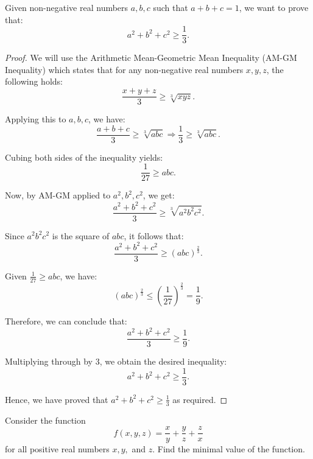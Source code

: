 \begin{exercise}
    Given non-negative real numbers \( a, b, c \) such that \( a + b + c = 1 \), we want to prove that:
\[ a^2 + b^2 + c^2 \geq \frac{1}{3}. \]
\end{exercise}
\begin{proof}
    We will use the Arithmetic Mean-Geometric Mean Inequality (AM-GM Inequality) which states that for any non-negative real numbers \( x, y, z \), the following holds:
\[ \frac{x + y + z}{3} \geq \sqrt[3]{xyz}. \]

Applying this to \( a, b, c \), we have:
\[ \frac{a + b + c}{3} \geq \sqrt[3]{abc} \Rightarrow \frac{1}{3} \geq \sqrt[3]{abc}. \]

Cubing both sides of the inequality yields:
\[ \frac{1}{27} \geq abc. \]

Now, by AM-GM applied to \( a^2, b^2, c^2 \), we get:
\[ \frac{a^2 + b^2 + c^2}{3} \geq \sqrt[3]{a^2b^2c^2}. \]

Since \( a^2b^2c^2 \) is the square of \( abc \), it follows that:
\[ \frac{a^2 + b^2 + c^2}{3} \geq (abc)^{\frac{2}{3}}. \]

Given \( \frac{1}{27} \geq abc \), we have:
\[ (abc)^{\frac{2}{3}} \leq \left(\frac{1}{27}\right)^{\frac{2}{3}} = \frac{1}{9}. \]

Therefore, we can conclude that:
\[ \frac{a^2 + b^2 + c^2}{3} \geq \frac{1}{9}. \]

Multiplying through by 3, we obtain the desired inequality:
\[ a^2 + b^2 + c^2 \geq \frac{1}{3}. \]

Hence, we have proved that \( a^2 + b^2 + c^2 \geq \frac{1}{3} \) as required.
\end{proof}

\begin{exercise}
    Consider the function
    \[
    f(x, y, z) = \frac{x}{y} + \frac{y}{z} + \frac{z}{x}
    \]
    for all positive real numbers \( x, y, \) and \( z \). Find the minimal value of the function.
    \end{exercise}
    
